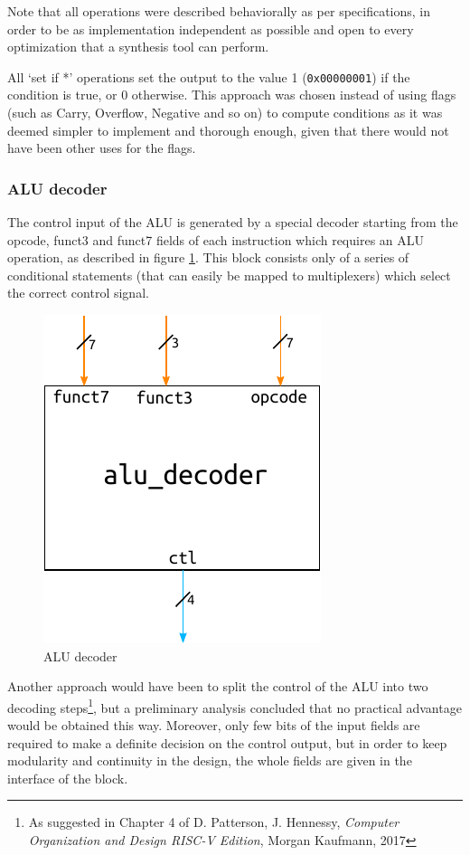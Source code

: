 \documentclass[a4paper]{article}
\begin{document}
Note that all operations were described behaviorally as per specifications, in order to be as implementation independent as possible and open to every optimization that a synthesis tool can perform.

All `set if *' operations set the output to the value 1 (\texttt{0x00000001}) if the condition is true, or 0 otherwise. This approach was chosen instead of using flags (such as Carry, Overflow, Negative and so on) to compute conditions as it was deemed simpler to implement and thorough enough, given that there would not have been other uses for the flags.

\subsubsection{ALU decoder}
The control input of the ALU is generated by a special decoder starting from the opcode, funct3 and funct7 fields of each instruction which requires an ALU operation, as described in figure \ref{fig:alu_dec}. This block consists only of a series of conditional statements (that can easily be mapped to multiplexers) which select the correct control signal.

\begin{figure}[hbtp]
    \centering
    \includegraphics[]{../alu/ref/schematic/alu_dec.pdf}
    \caption{ALU decoder}
    \label{fig:alu_dec}
\end{figure}

Another approach would have been to split the control of the ALU into two decoding steps\footnote{As suggested in Chapter 4 of D. Patterson, J. Hennessy, \emph{Computer Organization and Design RISC-V Edition}, Morgan Kaufmann, 2017}, but a preliminary analysis concluded that no practical advantage would be obtained this way.
Moreover, only few bits of the input fields are required to make a definite decision on the control output, but in order to keep modularity and continuity in the design, the whole fields are given in the interface of the block.
\end{document}
